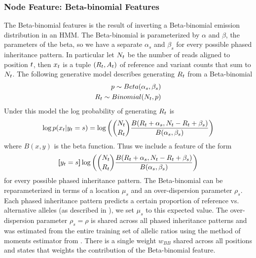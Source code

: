 \subsubsection{Node Feature: Beta-binomial Features}
The Beta-binomial features is the result of inverting a Beta-binomial emission distribution in an HMM. The Beta-binomial is parameterized by $\alpha$ and $\beta$, the parameters of the beta, so we have a separate $\alpha_s$ and $\beta_s$ for every possible phased inheritance pattern. In particular let $N_{t}$ be the number of reads aligned to position $t$, then $x_{t}$ is a tuple $(R_{t}, A_{t})$ of reference and variant counts that sum to $N_{t}$. The following generative model describes generating $R_{t}$ from a Beta-binomial
\begin{align*}
p \sim Beta(\alpha_s, \beta_s)\\
R_{t} \sim Binomial(N_{t}, p)
\end{align*}
Under this model the log probability of generating $R_{t}$ is
\begin{align*}
\log p(x_{t} | y_{t} = s) = \log \left(\binom{N_{t}}{R_{t}} \frac{B(R_{t} + \alpha_s, N_{t} - R_{t} + \beta_s)}{B(\alpha_s, \beta_s)}\right)
\end{align*}
where $B(x,y)$ is the beta function. Thus we include a feature of the form
\begin{align*}
\bm{[}y_{t} = s\bm{]}\log \left(\binom{N_{t}}{R_{t}} \frac{B(R_{t} + \alpha_s, N_{t} - R_{t} + \beta_s)}{B(\alpha_s, \beta_s)}\right) 
\end{align*}
for every possible phased inheritance pattern. The Beta-binomial can be reparameterized in terms of a location $\mu_s$ and an over-dispersion parameter $\rho_s$. Each phased inheritance pattern predicts a certain proportion of reference vs. alternative alleles (as described in \cite{rampasek2014fcnv}), we set $\mu_s$ to this expected value. The over-dispersion parameter $\rho_s = \rho$ is shared across all phased inheritance patterns and was estimated from the entire training set of allelic ratios using the method of moments estimator from \citet{weirHill2002}. There is a single weight $w_{BB}$ shared across all positions and states that weights the contribution of the Beta-binomial feature.

